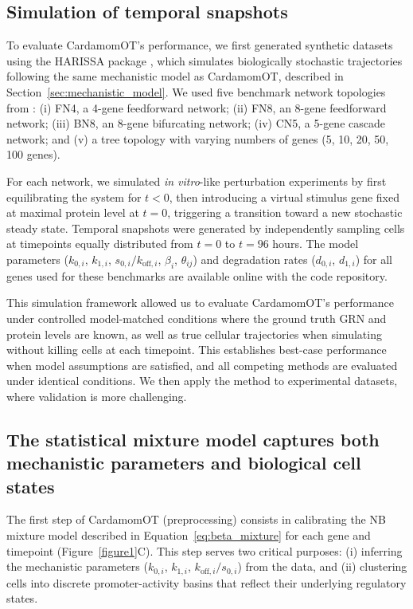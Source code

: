 \documentclass[a4paper, 11pt]{article}
\theoremstyle{plain}
\theoremstyle{remark}
\newcommand*{\firstreview}[1]{{\color{black}#1}}
\begin{document}
\subsection{Simulation of temporal snapshots}
\label{subsec:simulation_temporal_snapshots}

To evaluate CardamomOT's performance, we first generated synthetic datasets using the HARISSA package \cite{herbach2024harissa}, which simulates \firstreview{biologically stochastic trajectories following the same} mechanistic model \firstreview{as CardamomOT,} described in Section~\ref{sec:mechanistic_model}. We used five benchmark network topologies from \cite{ventre2023one}: (i) FN4, a 4-gene feedforward network; (ii) FN8, an 8-gene feedforward network; (iii) BN8, an 8-gene bifurcating network; (iv) CN5, a 5-gene cascade network; and (v) a tree topology with varying numbers of genes (5, 10, 20, 50, 100 genes).

For each network, we simulated \emph{in vitro}-like perturbation experiments by first equilibrating the system for $t<0$, then introducing a virtual stimulus gene fixed at maximal protein level at $t=0$, triggering a transition toward a new stochastic steady state. Temporal snapshots were generated by independently sampling cells at timepoints \firstreview{equally distributed} from $t=0$ to $t=96$ hours. The model parameters ($k_{0,i}$, $k_{1,i}$, $s_{0,i}/k_{\mathrm{off},i}$, $\beta_i$, $\theta_{ij}$) and degradation rates ($d_{0,i}$, $d_{1,i}$) for all genes used for these benchmarks are available online with the code repository.

This simulation framework allowed us to evaluate CardamomOT's performance under controlled \firstreview{model-matched} conditions where the ground truth GRN and protein levels are known, as well as true cellular trajectories when simulating without killing cells at each timepoint. \firstreview{This establishes best-case performance when model assumptions are satisfied, and all competing methods are evaluated under identical
conditions.} We then apply the method to experimental datasets, where validation is more challenging.

\subsection{The statistical mixture model captures both mechanistic parameters and biological cell states}
\label{subsec:statistical_model_validation}

The first step of CardamomOT (preprocessing) consists in calibrating the NB mixture model described in Equation~\eqref{eq:beta_mixture} for each gene and timepoint (Figure~\ref{figure1}C). This step serves two critical purposes: (i) inferring the mechanistic parameters ($k_{0,i}$, $k_{1,i}$, $k_{\mathrm{off},i}/s_{0,i}$) from the data, and (ii) clustering cells into discrete promoter-activity basins that reflect their underlying regulatory states.
\end{document}
